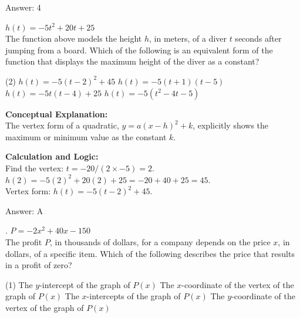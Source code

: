 \documentclass[11pt,paper=a4,answers]{exam}
\begin{document}
\begin{questions}
\begin{solution}
\vspace{25pt}

Answer: \colorbox{yellow!100}{4}
\end{solution}

\vspace{40pt}

\question
$h(t) = -5t^2 + 20t + 25$ \\
The function above models the height $h$, in meters, of a diver $t$ seconds after jumping from a board. Which of the following is an equivalent form of the function that displays the maximum height of the diver as a constant?
\begin{tasks}(2)
    \task $h(t) = -5(t-2)^2 + 45$
    \task $h(t) = -5(t+1)(t-5)$
    \task $h(t) = -5t(t-4) + 25$
    \task $h(t) = -5(t^2 - 4t - 5)$
\end{tasks}

\begin{solution}
\textbf{Conceptual Explanation:} \\
The vertex form of a quadratic, $y = a(x-h)^2 + k$, explicitly shows the maximum or minimum value as the constant $k$.

\vspace{20pt}

\textbf{Calculation and Logic:} \\
Find the vertex: $t = -20 / (2 \times -5) = 2$. \\
$h(2) = -5(2)^2 + 20(2) + 25 = -20 + 40 + 25 = 45$. \\
Vertex form: $h(t) = -5(t-2)^2 + 45$.

\vspace{25pt}

Answer: \colorbox{yellow!100}{A}
\end{solution}
.
\question
$P = -2x^2 + 40x - 150$ \\
The profit $P$, in thousands of dollars, for a company depends on the price $x$, in dollars, of a specific item. Which of the following describes the price that results in a profit of zero?
\begin{tasks}(1)
    \task The $y$-intercept of the graph of $P(x)$
    \task The $x$-coordinate of the vertex of the graph of $P(x)$
    \task The $x$-intercepts of the graph of $P(x)$
    \task The $y$-coordinate of the vertex of the graph of $P(x)$
\end{tasks}


\end{questions}
\end{document}
